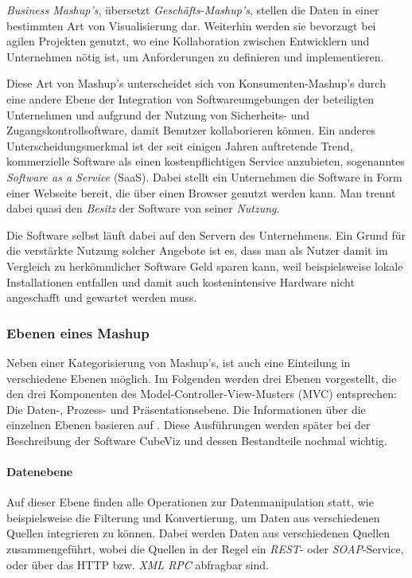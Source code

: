 \documentclass[11pt]{article}
\newcommand{\com}[1]{\marginpar{\em {\small{#1}}}} %
\begin{document}
\emph{Business Mashup's}, übersetzt \textit{Geschäfts-Mashup's}\com{Geschäfts-\\Mashup}, stellen die Daten in einer bestimmten Art von Visualisierung dar. Weiterhin werden sie bevorzugt bei agilen Projekten genutzt, wo eine Kollaboration zwischen Entwicklern und Unternehmen nötig ist, um Anforderungen zu definieren und implementieren. 

Diese Art von Mashup's unterscheidet sich von Konsumenten-Mashup's durch eine andere Ebene der Integration von Softwareumgebungen der beteiligten Unternehmen und aufgrund der Nutzung von Sicherheits- und Zugangskontrollsoftware, damit Benutzer kollaborieren können. Ein anderes Unterscheidungsmerkmal ist der seit einigen Jahren auftretende Trend, kommerzielle Software als einen kostenpflichtigen Service anzubieten, sogenanntes \textit{Software as a Service} (SaaS)\cite{SAAS-INTRO}.\com{SaaS} Dabei stellt ein Unternehmen die Software in Form einer Webseite bereit, die über einen Browser genutzt werden kann. Man trennt dabei quasi den \textit{Besitz} der Software von seiner \textit{Nutzung}.

Die Software selbst läuft dabei auf den Servern des Unternehmens. Ein Grund für die verstärkte Nutzung solcher Angebote ist es, dass man als Nutzer damit im Vergleich zu herkömmlicher Software Geld sparen kann, weil beispielsweise lokale Installationen entfallen und damit auch kostenintensive Hardware nicht angeschafft und gewartet werden muss. \cite[S. 2]{MASHUP-AND-ENTERP}


%
%
\subsubsection{Ebenen eines Mashup}

Neben einer Kategorisierung von Mashup's, ist auch eine Einteilung in verschiedene Ebenen möglich. Im Folgenden werden drei Ebenen vorgestellt, die den drei Komponenten des Model-Controller-View-Musters (MVC)\cite{MVC-ORIGIN} entsprechen: Die Daten-, Prozess- und Präsentationsebene. Die Informationen über die einzelnen Ebenen basieren auf \cite{MASHUP-DATA-INTERGRATION}. Diese Ausführungen werden später bei der Beschreibung der Software CubeViz und dessen Bestandteile nochmal wichtig.

%
%
\paragraph{Datenebene}

Auf dieser Ebene finden alle Operationen zur Datenmanipulation statt, wie beispielsweise die Filterung und Konvertierung, um Daten aus verschiedenen Quellen integrieren zu können. Dabei werden Daten aus verschiedenen Quellen zusammengeführt, wobei die Quellen in der Regel ein \textit{REST}- oder \textit{SOAP}-Service, oder über das HTTP bzw. \textit{XML RPC} abfragbar sind. 
\end{document}
